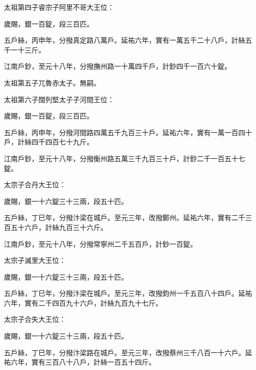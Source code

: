 \begin{pinyinscope}
 太祖第四子睿宗子阿里不哥大王位：



 歲賜，銀一百錠，段三百匹。



 五戶絲，丙申年，分撥真定路八萬戶。延祐六年，實有一萬五千二十八戶，計絲五千一十三斤。



 江南戶鈔，至元十八年，分撥撫州路一十萬四千戶，計鈔四千一百六十錠。



 太祖第五子兀魯赤太子。無嗣。



 太祖第六子闊列堅太子子河間王位：



 歲賜，銀一百錠，段三百匹。



 五戶絲，丙申年，分撥河間路四萬五千九百三十戶。延祐六年，實有一萬一百四十戶，計絲四千四百七十九斤。



 江南戶鈔，至元十八年，分撥衡州路五萬三千九百三十戶，計鈔二千一百五十七錠。



 太宗子合丹大王位：



 歲賜，銀一十六錠三十三兩，段五十匹。



 五戶絲，丁巳年，分撥汴梁在城戶。至元三年，改撥鄭州。延祐六年，實有二千三百五十六戶，計絲九百三十六斤。



 江南戶鈔，至元十八年，分撥常寧州二千五百戶，計鈔一百錠。



 太宗子滅里大王位：



 歲賜，銀一十六錠三十三兩，段五十匹。



 五戶絲，丁巳年，分撥汴梁在城戶。至元三年，改撥鈞州一千五百八十四戶。延祐六年，實有二千四百九十六戶，計絲九百九十七斤。



 太宗子合失大王位：



 歲賜，銀一十六錠三十三兩，段五十匹。



 五戶絲，丁巳年，分撥汴梁路在城戶。至元三年，改撥蔡州三千八百一十六戶。延祐六年，實有三百八十八戶，計絲一百五十四斤。




\end{pinyinscope}
